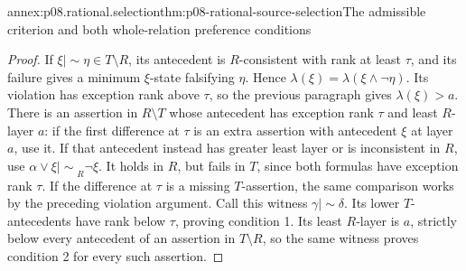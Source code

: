 \begin{annexitem}{annex:p08.rational.selection}{thm:p08-rational-source-selection}{The admissible criterion and both whole-relation preference conditions}
\begin{proof}
If \(\xi\mathrel{|\!\sim}\eta\in T\setminus R\), its
antecedent is \(R\)-consistent with rank at least \(\tau\), and
its failure gives a minimum \(\xi\)-state falsifying \(\eta\).
Hence \(\lambda(\xi)=\lambda(\xi\wedge\neg\eta)\).
Its violation has exception rank above \(\tau\), so the previous
paragraph gives \(\lambda(\xi)>a\).
There is an assertion in \(R\setminus T\) whose antecedent has
exception rank \(\tau\) and least \(R\)-layer \(a\): if the
first difference at \(\tau\) is an extra assertion with antecedent
\(\xi\) at layer \(a\), use it. If that antecedent instead has
greater least layer or is inconsistent in \(R\), use
\(\alpha\vee\xi\mathrel{|\!\sim}_R\neg\xi\).
It holds in \(R\), but fails in \(T\), since both formulas have
exception rank \(\tau\). If the difference at \(\tau\) is a
missing \(T\)-assertion, the same comparison works by the preceding
violation argument. Call this witness \(\gamma\mathrel{|\!\sim}\delta\).
Its lower \(T\)-antecedents have rank below \(\tau\), proving
condition 1. Its least \(R\)-layer is \(a\), strictly below
every antecedent of an assertion in \(T\setminus R\), so the
same witness proves condition 2 for every such assertion.


\end{proof}
\end{annexitem}
